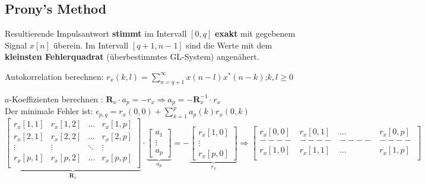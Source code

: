 \vspace{-1.0cm}


\subsection{Prony's Method }
Resultierende Impulsantwort \textbf{stimmt} im Intervall $[0, q]$ \textbf{exakt} mit
gegebenem Signal $x[n]$ überein. Im Intervall $[q + 1, n-1]$ sind die
Werte mit dem \textbf{kleinsten Fehlerquadrat} (überbestimmtes GL-System)
angenähert. 

\renewcommand{\arraystretch}{1.0}

\begin{aufzaehlung}
	\item Autokorrelation berechnen: $ r_x(k,l) = \sum\limits_{n=q+1}^\infty x(n-l)x^*(n-k)$;\qquad $k,l\geq 0$
	\item $a$-Koeffizienten berechnen : $\bm R_x \cdot a_p = -r_x \Longrightarrow a_p = - \bm R_x^{-1} \cdot r_x$ 
  		 \small\\
		Der minimale Fehler ist: $\epsilon_{p,q} = r_x(0,0) + \sum\limits_{k=1}^p a_p(k) r_x(0,k)$
			$$
		\underbrace{\begin{bmatrix}
    		r_x[1,1] & r_x[1,2] & \hdots & r_x[1,p] \\                                   
    		r_x[2,1] & r_x[2,2] & \hdots & r_x[2,p] \\
    		\vdots & \vdots & \ddots & \vdots \\                             
    		r_x[p,1] & r_x[p,2] & \hdots & r_x[p,p] \\                        
		\end{bmatrix}  }_{\bm R_x} \cdot 
		\underbrace{\begin{bmatrix}
    		a_1 \\
    		\vdots \\
    		a_p
		\end{bmatrix}  }_{a_p}= -\underbrace{\begin{bmatrix}
    		r_x[1,0] \\
    		\vdots \\
    		r_x[p,0]
		\end{bmatrix}  }_{r_x}
		\Longrightarrow
		\begin{bmatrix}
    		r_x[0,0] & r_x[0,1] & \hdots & r_x[0,p] \\ 
    		----&----&----&----\\
    		r_x[1,0] & r_x[1,1] & \hdots & r_x[1,p] \\                                   

\end{bmatrix}$$
\end{aufzaehlung}
